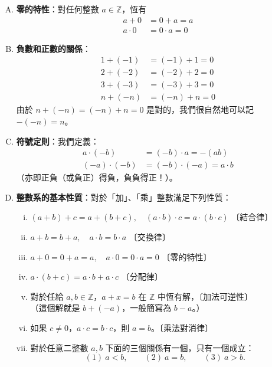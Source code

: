 \begin{enumerate}[(A)]
  \item \textbf{零的特性}：對任何整數 $a \in \mathbb{Z}$，恆有
  \begin{align*}
    a+0 &= 0+a = a \\
    a \cdot 0 &= 0 \cdot a = 0
  \end{align*}
  \item \textbf{負數和正數的關係}：
  \begin{align*}
    1+(-1) &= (-1)+1 = 0 \\
    2+(-2) &= (-2)+2 = 0 \\
    3+(-3) &= (-3)+3 = 0 \\
    n+(-n) &= (-n)+n = 0
  \end{align*}
  由於 $n+(-n) = (-n)+n = 0$ 是對的，我們很自然地可以記 $-(-n) = n$。
  \item \textbf{符號定則}：我們定義：
  \begin{align*}
    a \cdot (-b) &= (-b) \cdot a = -(ab) \\
    (-a) \cdot (-b) &= (-b) \cdot (-a) = a \cdot b
  \end{align*}
  （亦即正負（或負正）得負，負負得正！）。
  \item \textbf{整數系的基本性質}：對於「加」、「乘」整數滿足下列性質：
  \begin{enumerate}[(i)]
    \item $(a+b)+c = a+(b+c), \quad (a \cdot b) \cdot c = a \cdot (b \cdot c)$ 〔結合律〕
    \item $a+b = b+a, \quad a \cdot b = b \cdot a$ 〔交換律〕
    \item $a+0 = 0+a = a, \quad a \cdot 0 = 0 \cdot a = 0$ 〔零的特性〕
    \item $a \cdot (b+c) = a \cdot b + a \cdot c$ 〔分配律〕
    \item 對於任給 $a, b \in \mathbb{Z}$，$a+x=b$ 在 $\mathbb{Z}$ 中恆有解，〔加法可逆性〕\\
    （這個解就是 $b+(-a)$，一般簡寫為 $b-a$。）
    \item 如果 $c \neq 0$，$a \cdot c = b \cdot c$，則 $a = b$。〔乘法對消律〕
    \item 對於任意二整數 $a, b$ 下面的三個關係有一個，只有一個成立：
    \begin{equation*}
      (1)\ a < b, \qquad (2)\ a = b, \qquad (3)\ a > b.
    \end{equation*}
  \end{enumerate}
\end{enumerate}

